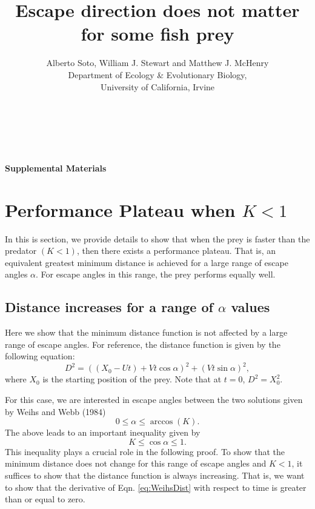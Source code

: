 \documentclass[12pt]{article}
\title{Escape direction does not matter for some fish prey}
\author{Alberto Soto, William J. Stewart and Matthew J. McHenry\\
  Department of Ecology \& Evolutionary Biology,\\
  University of California, Irvine\\ \\ \\ \\}
\begin{document}

{\Large \textbf{Supplemental Materials}}


\section{Performance Plateau when $K < 1$}
In this is section, we provide details to show that when the prey is faster than the predator $(K<1)$, then there exists a performance plateau. That is, an equivalent greatest minimum distance is  achieved for a large range of escape angles $\alpha$. For escape angles in this range, the prey performs equally well.   

\subsection{Distance increases for a range of $\alpha$ values}
Here we show that the minimum distance function is not affected by a large range of escape angles. For reference, the distance function is given by the following equation:
%
\begin{equation}
D^2 = ((X_0 - Ut) + Vt\cos\alpha)^2 + (Vt\sin\alpha)^2,
\label{eq:WeihsDist}
\end{equation}
%
where $X_0$ is the starting position of the prey. Note that at $t=0$, $D^2 = X_0^2.$ 

For this case, we are interested in escape angles between the two solutions given by Weihs and Webb (1984)
%
\begin{equation}
0 \leq \alpha \leq \arccos(K).
\label{alpharange}
\end{equation}
The above leads to an important inequality given by
\begin{equation}
K \leq \cos\alpha \leq 1.
\label{cosinebound}
\end{equation} 
This inequality plays a crucial role in the following proof.      
%
To show that the minimum distance does not change for this range of escape angles and $K<1$, it suffices to show that the distance function is always increasing. That is, we want to show that the derivative of Eqn. \ref{eq:WeihsDist} with respect to time is greater than or equal to zero. 
\end{document}
